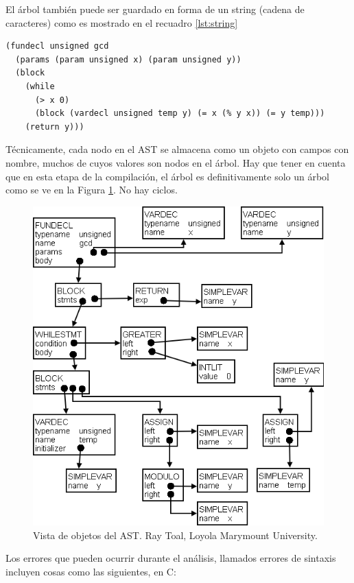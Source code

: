 El árbol también puede ser guardado en forma de un string (cadena de caracteres) como es mostrado en el recuadro \ref{lst:string}

\begin{lstlisting}[label={lst:ast}, caption={AST}, captionpos={b}, frame={shadowbox}]
(fundecl unsigned gcd
  (params (param unsigned x) (param unsigned y))
  (block
    (while
      (> x 0)
      (block (vardecl unsigned temp y) (= x (% y x)) (= y temp)))
    (return y)))
\end{lstlisting}

Técnicamente, cada nodo en el AST se almacena como un objeto con campos con nombre, muchos de cuyos valores son nodos en el árbol. Hay que tener en cuenta que en esta etapa de la compilación, el árbol es definitivamente solo un árbol como se ve en la Figura \ref{fig:ast objects}. No hay ciclos.

\begin{figure}[h]
    \centering
    \includegraphics[scale=0.3]{images/gcdast2.png}
    \caption{Vista de objetos del AST. Ray Toal, Loyola Marymount University.}
    \label{fig:ast objects}
\end{figure}

Los errores que pueden ocurrir durante el análisis, llamados errores de sintaxis incluyen cosas como las siguientes, en C:

